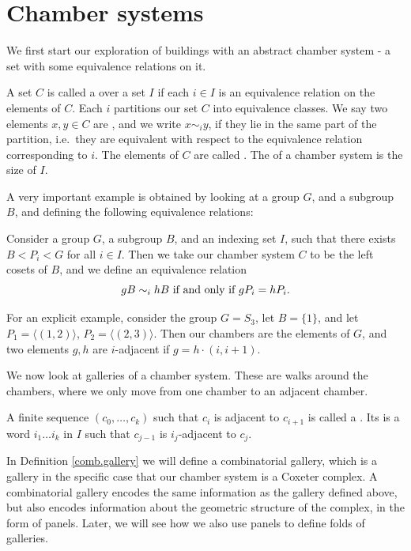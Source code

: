 \documentclass[11pt]{article}
\begin{document}
\section{Chamber systems} \label{2}
We first start our exploration of buildings with an abstract chamber system - a set with some equivalence relations on it.  

\begin{definition}
    A set $C$ is called a  over a set $I$ if each $i\in I$ is an equivalence relation on the elements of $C$. Each $i$ partitions our set $C$ into equivalence classes. We say two elements $x,y\in C$ are , and we write $x\sim_{i} y$, if they lie in the same part of the partition, i.e.\ they are equivalent with respect to the equivalence relation corresponding to $i$. The elements of $C$ are called . The  of a chamber system is the size of $I$. 
\end{definition}


A very important example is obtained by looking at a group $G$, and a subgroup $B$, and defining the following equivalence relations: 

\begin{example}\label{S3}
    Consider a group $G$, a subgroup $B$, and an indexing set $I$, such that there exists $B<P_i<G$ for all $i\in I$. Then we take our chamber system $C$ to be the left cosets of $B$, and we define an equivalence relation
    \[gB\sim_{i}hB \textnormal{ if and only if }gP_i=hP_i.\]

    For an explicit example, consider the group $G=S_3$, let $B=\{1\}$, and let $P_1=\langle (1,2)\rangle$, $P_2=\langle (2,3)\rangle$. Then our chambers are the elements of $G$, and two elements $g,h$ are $i$-adjacent if $g=h\cdot(i,i+1)$. 
\end{example}

We now look at galleries of a chamber system. These are walks around the chambers, where we only move from one chamber to an adjacent chamber. 

\begin{definition}\label{gallery}
    A finite sequence $(c_0,\hdots ,c_k)$ such that $c_i$ is adjacent to $c_{i+1}$ is called a . Its  is a word $i_1\hdots i_k$ in $I$ such that  $c_{j-1}$ is $i_j$-adjacent to $c_{j}$. 
\end{definition}

In Definition \ref{comb.gallery} we will define a combinatorial gallery, which is a gallery in the specific case that our chamber system is a Coxeter complex. A combinatorial gallery encodes the same information as the gallery defined above, but also encodes information about the geometric structure of the complex, in the form of panels. Later, we will see how we also use panels to define folds of galleries.
\end{document}

